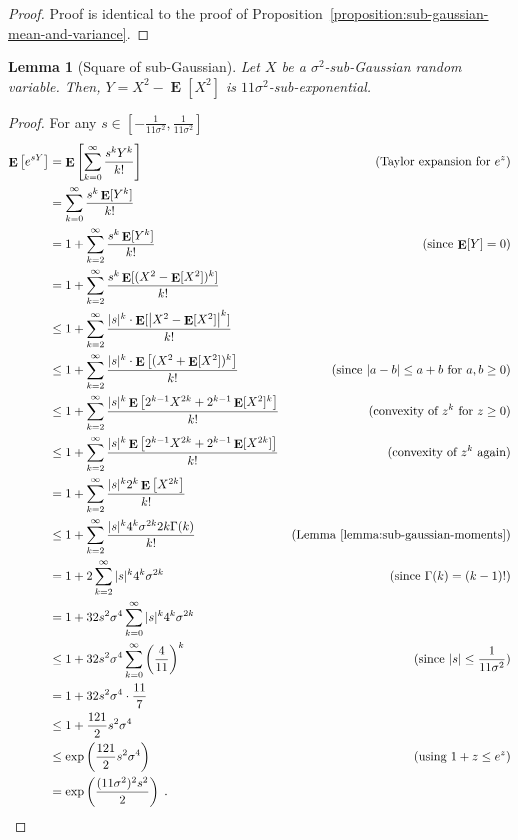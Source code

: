 \documentclass[12pt]{article}
\newtheorem{lemma}[definition]{Lemma}
\DeclareMathOperator*{\Exp}{\mathbf{E}}
\begin{document}
\begin{proof}
Proof is identical to the proof of Proposition~\ref{proposition:sub-gaussian-mean-and-variance}.
\end{proof}

\begin{lemma}[Square of sub-Gaussian]
\label{lemma:sub-gaussian-square}
Let $X$ be a $\sigma^2$-sub-Gaussian random variable.
Then, $Y = X^2 - \Exp[X^2]$ is $11\sigma^2$-sub-exponential.
\end{lemma}

\begin{proof}
For any $s \in [-\frac{1}{11\sigma^2}, \frac{1}{11\sigma^2}]$
\begin{align*}
\Exp\left[e^{sY}\right]
& = \Exp\left[ \sum_{k=0}^\infty \frac{s^k Y^k}{k!} \right] & \text{(Taylor expansion for $e^z$)} \\
& = \sum_{k=0}^\infty \frac{s^k \Exp[Y^k]}{k!} \\
& = 1 + \sum_{k=2}^\infty \frac{s^k \Exp[Y^k]}{k!} & \text{(since $\Exp[Y] = 0$)} \\
& = 1 + \sum_{k=2}^\infty \frac{s^k \Exp[(X^2 - \Exp[X^2])^k]}{k!} \\
& \le 1 + \sum_{k=2}^\infty \frac{|s|^k \cdot \Exp[\left|X^2 - \Exp[X^2]\right|^k]}{k!} \\
& \le 1 + \sum_{k=2}^\infty \frac{|s|^k \cdot \Exp \left[(X^2 + \Exp[X^2])^k \right]}{k!} & \text{(since $|a - b| \le a + b$ for $a,b \ge 0$)} \\
& \le 1 + \sum_{k=2}^\infty \frac{|s|^k \Exp\left[2^{k-1} X^{2k} + 2^{k-1} \Exp[X^2]^k \right]}{k!} & \text{(convexity of $z^k$ for $z \ge 0$)} \\
& \le 1 + \sum_{k=2}^\infty \frac{|s|^k \Exp\left[2^{k-1} X^{2k} + 2^{k-1} \Exp[X^{2k}] \right]}{k!} & \text{(convexity of $z^k$ again)} \\
& = 1 + \sum_{k=2}^\infty \frac{|s|^k 2^k \Exp\left[X^{2k} \right]}{k!} \\
& \le 1 + \sum_{k=2}^\infty \frac{|s|^k 4^k \sigma^{2k} 2k \Gamma(k)}{k!} & \text{(Lemma~\ref{lemma:sub-gaussian-moments})} \\
& = 1 + 2 \sum_{k=2}^\infty |s|^k 4^k \sigma^{2k} & \text{(since $\Gamma(k) = (k-1)!$)} \\
& = 1 + 32 s^2 \sigma^4 \sum_{k=0}^\infty |s|^k 4^k \sigma^{2k} \\
& \le 1 + 32 s^2 \sigma^4 \sum_{k=0}^\infty \left(\frac{4}{11}\right)^k & \text{(since $|s| \le \frac{1}{11\sigma^2}$)} \\
& = 1 + 32 s^2 \sigma^4 \cdot \frac{11}{7} \\
& \le 1 + \frac{121}{2} s^2 \sigma^4 \\
& \le \exp\left(\frac{121}{2} s^2 \sigma^4 \right) & \text{(using $1+z \le e^z$)} \\
& = \exp\left(\frac{(11 \sigma^2)^2 s^2}{2} \right) \; .
\end{align*}
\end{proof}
\end{document}
